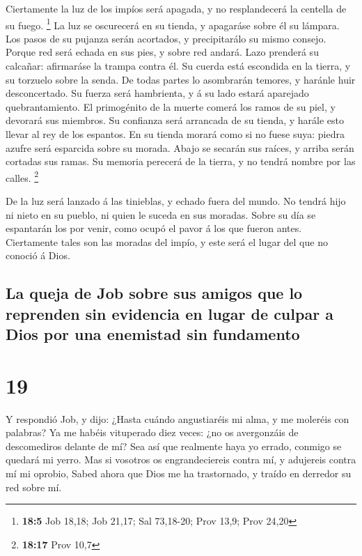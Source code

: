  Ciertamente la luz de los impíos será apagada, y no
resplandecerá la centella de su fuego. \footnote{\textbf{18:5} Job
  18,18; Job 21,17; Sal 73,18-20; Prov 13,9; Prov 24,20}  La
luz se oscurecerá en su tienda, y apagaráse sobre él su lámpara.
 Los pasos de su pujanza serán acortados, y precipitarálo su
mismo consejo.  Porque red será echada en sus pies, y sobre
red andará.  Lazo prenderá su calcañar: afirmaráse la trampa
contra él.  Su cuerda está escondida en la tierra, y su
torzuelo sobre la senda.  De todas partes lo asombrarán
temores, y haránle huir desconcertado.  Su fuerza será
hambrienta, y á su lado estará aparejado quebrantamiento. 
El primogénito de la muerte comerá los ramos de su piel, y devorará sus
miembros.  Su confianza será arrancada de su tienda, y
harále esto llevar al rey de los espantos.  En su tienda
morará como si no fuese suya: piedra azufre será esparcida sobre su
morada.  Abajo se secarán sus raíces, y arriba serán
cortadas sus ramas.  Su memoria perecerá de la tierra, y no
tendrá nombre por las calles. \footnote{\textbf{18:17} Prov 10,7}

 De la luz será lanzado á las tinieblas, y echado fuera del
mundo.  No tendrá hijo ni nieto en su pueblo, ni quien le
suceda en sus moradas.  Sobre su día se espantarán los por
venir, como ocupó el pavor á los que fueron antes. 
Ciertamente tales son las moradas del impío, y este será el lugar del
que no conoció á Dios.

\hypertarget{la-queja-de-job-sobre-sus-amigos-que-lo-reprenden-sin-evidencia-en-lugar-de-culpar-a-dios-por-una-enemistad-sin-fundamento}{%
\subsection{La queja de Job sobre sus amigos que lo reprenden sin
evidencia en lugar de culpar a Dios por una enemistad sin
fundamento}\label{la-queja-de-job-sobre-sus-amigos-que-lo-reprenden-sin-evidencia-en-lugar-de-culpar-a-dios-por-una-enemistad-sin-fundamento}}

\hypertarget{section-18}{%
\section{19}\label{section-18}}

 Y respondió Job, y dijo:  ¿Hasta cuándo
angustiaréis mi alma, y me moleréis con palabras?  Ya me
habéis vituperado diez veces: ¿no os avergonzáis de descomediros delante
de mí?  Sea así que realmente haya yo errado, conmigo se
quedará mi yerro.  Mas si vosotros os engrandeciereis contra
mí, y adujereis contra mí mi oprobio,  Sabed ahora que Dios
me ha trastornado, y traído en derredor su red sobre mí.

